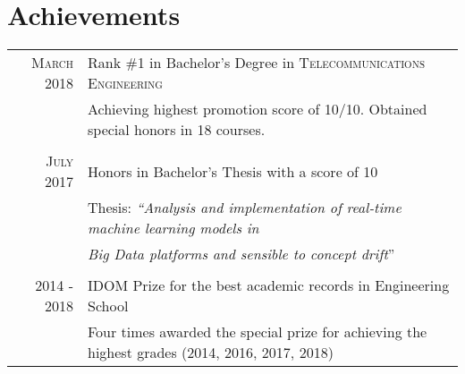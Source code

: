 \documentclass[a4paper,10pt]{article}
\begin{document}
\section{Achievements}
\begin{tabular}{rp{13.6cm}}
\textsc{March} 2018 & Rank \#1 in Bachelor's Degree in \textsc{Telecommunications Engineering} \\%
&\footnotesize{Achieving highest promotion score of 10/10. Obtained special honors in 18 courses.} \\&\\

\textsc{July} 2017 & Honors in Bachelor's Thesis with a score of 10 \\%
& \footnotesize{Thesis: \emph{``Analysis and implementation of real-time machine learning models in}} \\
& \footnotesize{ \hspace{10mm}\emph{ Big Data platforms and sensible to concept drift}'' }\\&\\

2014 - 2018 & IDOM Prize for the best academic records in Engineering School\\%
&\footnotesize{ Four times awarded the special prize for achieving the highest grades (2014, 2016, 2017, 2018)} \\
\end{tabular}


\end{document}
